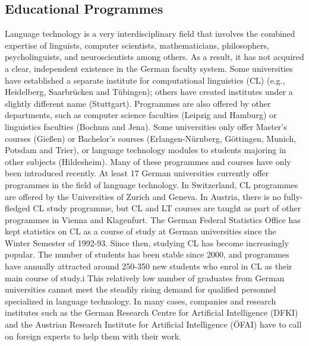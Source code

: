 \documentclass[]{../metanetpaper}
\begin{document}
	\subsection{Educational Programmes}
Language technology is a very interdisciplinary field that involves the combined expertise of linguists, computer scientists, mathematicians, philosophers, psycholinguists, and neuroscientists among others. As a result, it has not acquired a clear, independent existence in the German faculty system. Some universities have established a separate institute for computational linguistics (CL) (e.g., Heidelberg, Saarbrücken and Tübingen); others have created institutes under a slightly different name (Stuttgart). Programmes are also offered by other departments, such as computer science faculties (Leipzig and Hamburg) or linguistics faculties (Bochum and Jena). Some universities only offer Master’s courses (Gießen) or Bachelor’s courses (Erlangen-Nürnberg, Göttingen, Munich, Potsdam and Trier), or language technology modules to students majoring in other subjects (Hildesheim). Many of these programmes and courses have only been introduced recently. At least 17 German universities currently offer programmes in the field of language technology. In Switzerland, CL programmes are offered by the Universities of Zurich and Geneva. In Austria, there is no fully-fledged CL study programme, but CL and LT courses are taught as part of other programmes in Vienna and Klagenfurt.
The German Federal Statistics Office has kept statistics on CL as a course of study at German universities since the Winter Semester of 1992-93. Since then, studying CL has become increasingly popular. The number of students has been stable since 2000, and programmes have annually attracted around 250-350 new students who enrol in CL as their main course of study.i This relatively low number of graduates from German universities cannot meet the steadily rising demand for qualified personnel specialized in language technology. In many cases, companies and research institutes such as the German Research Centre for Artificial Intelligence (DFKI) and the Austrian Research Institute for Artificial Intelligence (ÖFAI) have to call on foreign experts to help them with their work. 
\end{document}
